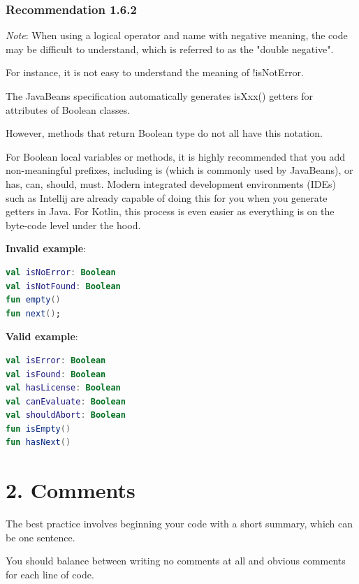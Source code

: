 \subsubsection*{\textbf{Recommendation 1.6.2}}
\leavevmode\newline



\textit{Note}: When using a logical operator and name with negative meaning, the code may be difficult to understand, which is referred to as the "double negative".

For instance, it is not easy to understand the meaning of !isNotError.

The JavaBeans specification automatically generates isXxx() getters for attributes of Boolean classes.

However, methods that return Boolean type do not all have this notation.

For Boolean local variables or methods, it is highly recommended that you add non-meaningful prefixes, including is (which is commonly used by JavaBeans), or has, can, should, must. Modern integrated development environments (IDEs) such as Intellij are already capable of doing this for you when you generate getters in Java. For Kotlin, this process is even easier as everything is on the byte-code level under the hood.



\textbf{Invalid example}: 

\begin{lstlisting}[language=Kotlin]
val isNoError: Boolean
val isNotFound: Boolean
fun empty()
fun next();
\end{lstlisting}


\textbf{Valid example}:

\begin{lstlisting}[language=Kotlin]
val isError: Boolean
val isFound: Boolean
val hasLicense: Boolean
val canEvaluate: Boolean
val shouldAbort: Boolean
fun isEmpty()
fun hasNext()
\end{lstlisting}
\section*{\textbf{2. Comments}}



The best practice involves beginning your code with a short summary, which can be one sentence.

You should balance between writing no comments at all and obvious comments for each line of code.

